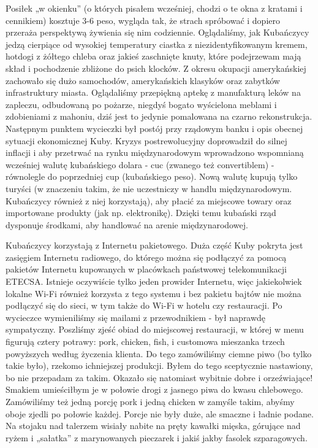 Posiłek „w okienku” (o których pisałem wcześniej, chodzi o te okna z kratami i cennikiem) kosztuje 3-6 peso, wygląda tak, że strach spróbować i dopiero przeraża perspektywą żywienia się nim codziennie.
Oglądaliśmy, jak Kubańczycy jedzą cierpiące od wysokiej temperatury ciastka z niezidentyfikowanym kremem, hotdogi z żółtego chleba oraz jakieś zaschnięte knuty, które podejrzewam mają skład i pochodzenie zbliżone do psich klocków.
Z okresu okupacji amerykańskiej zachowało się dużo samochodów, amerykańskich klasyków oraz zabytków infrastruktury miasta.
Oglądaliśmy przepiękną aptekę z manufakturą leków na zapleczu, odbudowaną po pożarze, niegdyś bogato wyścielona meblami i zdobieniami z mahoniu, dziś jest to jedynie pomalowana na czarno rekonstrukcja.
Następnym punktem wycieczki był postój przy rządowym banku i opis obecnej sytuacji ekonomicznej Kuby.
Kryzys postrewolucyjny doprowadził do silnej inflacji i aby przetrwać na rynku międzynarodowym wprowadzono wspomnianą wcześniej walutę kubańskiego dolara - cuc (zwanego też convertiblem) - równolegle do poprzedniej cup (kubańskiego peso).
Nową walutę kupują tylko turyści (w znaczeniu takim, że nie uczestniczy w handlu międzynarodowym. Kubańczycy również z niej korzystają), aby płacić za miejscowe towary oraz importowane produkty (jak np.
elektronikę). Dzięki temu kubański rząd dysponuje środkami, aby handlować na arenie międzynarodowej.
\par Kubańczycy korzystają z Internetu pakietowego.
Duża część Kuby pokryta jest zasięgiem Internetu radiowego, do którego można się podłączyć za pomocą pakietów Internetu kupowanych w placówkach państwowej telekomunikacji ETECSA.
Istnieje oczywiście tylko jeden prowider Internetu, więc jakiekolwiek lokalne Wi-Fi również korzysta z tego systemu i bez pakietu bajtów nie można podłączyć się do sieci, w tym także do Wi-Fi w hotelu czy restauracji.
Po wycieczce wymieniliśmy się mailami z przewodnikiem - był naprawdę sympatyczny.
Poszliśmy zjeść obiad do miejscowej restauracji, w której w menu figurują cztery potrawy: pork, chicken, fish, i customowa mieszanka trzech powyższych według życzenia klienta.
Do tego zamówiliśmy ciemne piwo (bo tylko takie było), rzekomo ichniejszej produkcji.
Byłem do tego sceptycznie nastawiony, bo nie przepadam za takim.
Okazało się natomiast wybitnie dobre i orzeźwiające!
Smakiem umieściłbym je w połowie drogi z jasnego piwa do kwasu chlebowego.
Zamówiliśmy też jedną porcję pork i jedną chicken w zamyśle takim, abyśmy oboje zjedli po połowie każdej.
Porcje nie były duże, ale smaczne i ładnie podane. Na stojaku nad talerzem wisiały nabite na pręty kawałki mięska, górujące nad ryżem i „sałatka” z marynowanych pieczarek i jakiś jakby fasolek szparagowych.
